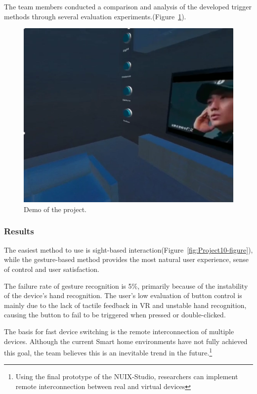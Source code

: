 The team members conducted a comparison and analysis of the developed trigger methods through several evaluation experiments.(Figure~\ref{fig:Project2-figure}).

\begin{figure}
  \centering
  \includegraphics[width=0.6\linewidth]{figures/Project_2.png}
  \caption{Demo of the project.}
  \label{fig:Project2-figure}
\end{figure}

\subsubsection{Results}

The easiest method to use is sight-based interaction(Figure~\ref{fig:Project10-figure}), while the gesture-based method provides the most natural user experience, sense of control and user satisfaction.

The failure rate of gesture recognition is 5\%, primarily because of the instability of the device's hand recognition.
The user's low evaluation of button control is mainly due to the lack of tactile feedback in VR and unstable hand recognition, causing the button to fail to be triggered when pressed or double-clicked.

The basis for fast device switching is the remote interconnection of multiple devices. Although the current Smart home environments have not fully achieved this goal, the team believes this is an inevitable trend in the future.\footnote{Using the final prototype of the NUIX-Studio, researchers can implement remote interconnection between real and virtual devices}


